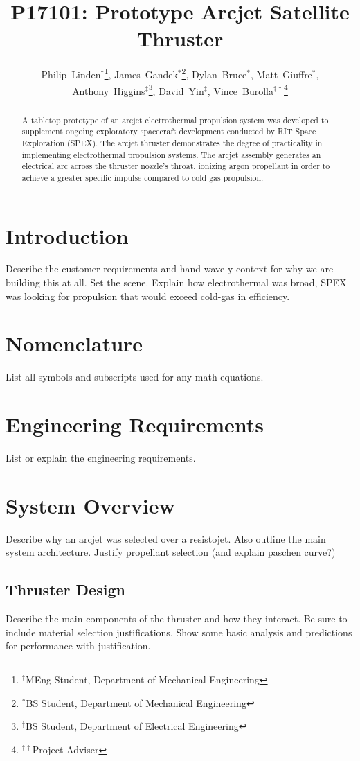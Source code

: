 \documentclass[journal]{IEEEtran}
\title{P17101: Prototype Arcjet Satellite Thruster}
\author{
  Philip~Linden$^{\dagger}$\thanks{$^{\dagger}$MEng Student, Department of Mechanical Engineering},
  James~Gandek$^{*}$\thanks{$^{*}$BS Student, Department of Mechanical Engineering},
  Dylan~Bruce$^{*}$,
  Matt~Giuffre$^{*}$,
  Anthony~Higgins$^{\ddagger}$\thanks{$^{\ddagger}$BS Student, Department of Electrical Engineering},
  David~Yin$^{\ddagger}$,
  Vince~Burolla$^{\dagger\dagger}$\thanks{$^{\dagger\dagger}$Project Adviser}
}
\begin{document}
\maketitle

\begin{abstract}
A tabletop prototype of an arcjet electrothermal propulsion system was developed to supplement ongoing exploratory spacecraft development conducted by RIT Space Exploration (SPEX). The arcjet thruster demonstrates the degree of practicality in implementing electrothermal propulsion systems. The arcjet assembly generates an electrical arc across the thruster nozzle's throat, ionizing argon propellant in order to achieve a greater specific impulse compared to cold gas propulsion.
\end{abstract}
\section{Introduction}
Describe the customer requirements and hand wave-y context for why we are building this at all. Set the scene. Explain how electrothermal was broad, SPEX was looking for propulsion that would exceed cold-gas in efficiency.

\section{Nomenclature}
List all symbols and subscripts used for any math equations.

\section{Engineering Requirements}
List or explain the engineering requirements.

\section{System Overview}
Describe why an arcjet was selected over a resistojet.
Also outline the main system architecture.
Justify propellant selection (and explain paschen curve?)

\subsection{Thruster Design}
Describe the main components of the thruster and how they interact. Be sure to include material selection justifications. Show some basic analysis and predictions for performance with justification.
\end{document}
